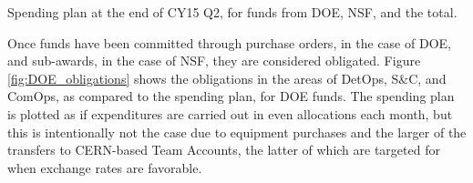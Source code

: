 \begin{table}[hbtp]
  \begin{center}
    \caption{Spending plan at the end of CY15 Q2, for funds from DOE, NSF, and the total.}
    \label{tab:spending_plan}
  \end{center}
\end{table}

Once funds have been committed through purchase orders, in the case of DOE, and
sub-awards, in the case of NSF, they are considered obligated.
Figure \ref{fig:DOE_obligations} shows the obligations in the areas of DetOps,
S\&C, and ComOps, as compared to the spending plan, for DOE funds.  The spending
plan is plotted as if expenditures are carried out in even allocations each month, but this is
intentionally not the case due to equipment purchases and the larger of the transfers to CERN-based
Team Accounts, the latter of which are targeted for when exchange rates are favorable.

